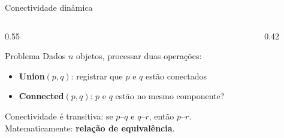 \documentclass[aspectratio=169]{beamer}
\begin{document}
\begin{frame}{Conectividade dinâmica}%
  \begin{columns}[T]
    \begin{column}{0.55\textwidth}
      \begin{block}{Problema}
        Dados $n$ objetos, processar duas operações:
        \begin{itemize}
          \item \textbf{Union}$(p,q)$: registrar que $p$ e $q$ estão conectados
          \item \textbf{Connected}$(p,q)$: $p$ e $q$ estão no mesmo componente?
        \end{itemize}
      \end{block}
      \vspace{0.25cm}
      Conectividade é transitiva: se $p$--$q$ e $q$--$r$, então $p$--$r$.\\
      Matematicamente: \textbf{relação de equivalência}.
    \end{column}
    \begin{column}{0.42\textwidth}
    \end{column}
  \end{columns}
\end{frame}
\end{document}

